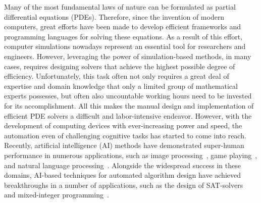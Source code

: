 Many of the most fundamental laws of nature can be formulated as partial differential equations (PDEs).
Therefore, since the invention of modern computers, great efforts have been made to develop efficient frameworks and programming languages for solving these equations.
As a result of this effort, computer simulations nowadays represent an essential tool for researchers and engineers.
However, leveraging the power of simulation-based methods, in many cases, requires designing solvers that achieve the highest possible degree of efficiency.
Unfortunately, this task often not only requires a great deal of expertise and domain knowledge that only a limited group of mathematical experts possesses, but often also uncountable working hours need to be invested for its accomplishment.
All this makes the manual design and implementation of efficient PDE solvers a difficult and labor-intensive endeavor.
However, with the development of computing devices with ever-increasing power and speed, the automation even of challenging cognitive tasks has started to come into reach.
Recently, artificial intelligence (AI) methods have demonstrated super-human performance in numerous applications, such as image processing~\cite{krizhevsky2017imagenet}, game playing~\cite{schrittwieser2020mastering,reed2022generalist}, and natural language processing~\cite{brown2020language}.
Alongside the widespread success in these domains, AI-based techniques for automated algorithm design have achieved breakthroughs in a number of applications, such as the design of SAT-solvers~\cite{khudabukhsh2016satenstein} and mixed-integer programming~\cite{hutter2010automated}.

